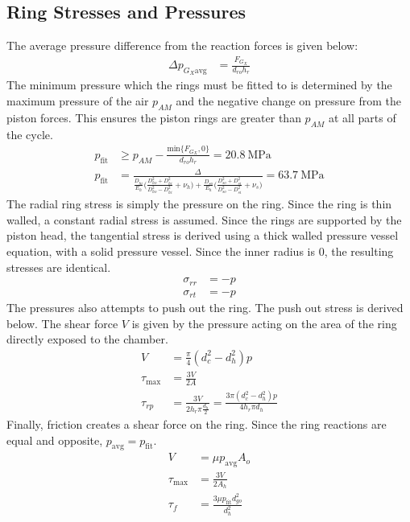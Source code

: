 \documentclass[10pt,a4paper]{article}
\begin{document}
	\subsection*{Ring Stresses and Pressures}
	The average pressure difference from the reaction forces is given below:
	\begin{align*}
	 \Delta p_{G_X \text{avg}} &= \frac{F_{G_X}}{d_{ro} h_r}
	\end{align*}
	The minimum pressure which the rings must be fitted to is determined by the maximum pressure of the air $p_{AM}$ and the negative change on pressure from the piston forces. This ensures the piston rings are greater than $p_{AM}$ at all parts of the cycle.
	\begin{align*}
	p_{\text{fit}} &\geq p_{AM} - \frac{\text{min} \{ F_{G_X}, 0 \}}{d_{ro} h_r} = 20.8\ \text{MPa}\\
	p_{\text{fit}} &= \frac{\Delta}{\frac{D_{hi}}{E_h} \Big( \frac{D_{ho}^2+D_{hi}^2}{D_{ho}^2-D_{hi}^2} + \nu_h \big) +\frac{D_{so}}{E_h} \Big( \frac{D_{so}^2+D_{si}^2}{D_{so}^2-D_{si}^2} + \nu_s \big) } = 63.7\ \text{MPa}
	\end{align*}
	The radial ring stress is simply the pressure on the ring. Since the ring is thin walled, a constant radial stress is assumed.
	Since the rings are supported by the piston head, the tangential stress is derived using a thick walled pressure vessel equation, with a solid pressure vessel. Since the inner radius is 0, the resulting stresses are identical.
	\begin{align*}
		\sigma_{r r} &= -p\\
		\sigma_{r t} &= -p
	\end{align*}
	The pressures also attempts to push out the ring. The push out stress is derived below. The shear force $V$ is given by the pressure acting on the area of the ring directly exposed to the chamber.
	\begin{align*}
	 V &= \frac{\pi}{4}(d_{c}^2-d_{h}^2) p\\
	 \tau_{\text{max}} &= \frac{3V}{2A} \\
	 \tau_{rp} &= \frac{3V}{2 h_r \pi \frac{d_h}{2} } = \frac{3 \pi (d_{c}^2-d_{h}^2) p}{4 h_r \pi d_h} 
	\end{align*}
	Finally, friction creates a shear force on the ring. Since the ring reactions are equal and opposite, $p_{\text{avg}} = p_{\text{fit}}$.
	\begin{align*}
		V &=  \mu p_{\text{avg}} A_o \\
		\tau_{\text{max}} &= \frac{3V}{2A_h} \\
		\tau_{f} &= \frac{3 \mu p_{\text{fit}} d_{go}^2}{d_h^2} 
	\end{align*}
\end{document}

